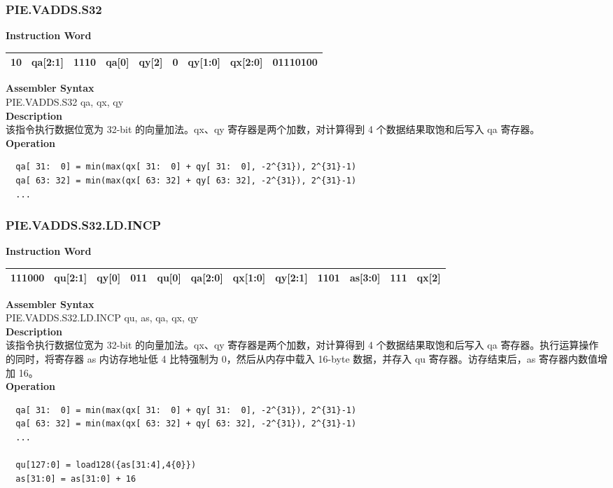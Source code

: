 \newpage
\subsubsection{PIE.VADDS.S32}\label{instruction:PIEVADDSS32}
\setlength\tabcolsep{6pt}
\textbf{Instruction Word} \\
\begin{tabular}{|c|c|c|c|c|c|c|c|c|}
	\hline
	10 & qa[2:1] & 1110 & qa[0] & qy[2] & 0 & qy[1:0] & qx[2:0] & 01110100 \\
	\hline
\end{tabular}

\textbf{Assembler Syntax} \\
PIE.VADDS.S32 qa, qx, qy \\
\textbf{Description} \\
该指令执行数据位宽为 32-bit 的向量加法。qx、qy 寄存器是两个加数，对计算得到 4 个数据结果取饱和后写入 qa 寄存器。\\
\textbf{Operation}
\begin{lstlisting}
  qa[ 31:  0] = min(max(qx[ 31:  0] + qy[ 31:  0], -2^{31}), 2^{31}-1)
  qa[ 63: 32] = min(max(qx[ 63: 32] + qy[ 63: 32], -2^{31}), 2^{31}-1)
  ...
\end{lstlisting}

\newpage
\subsubsection{PIE.VADDS.S32.LD.INCP}\label{instruction:PIEVADDSS32LDINCP}
\setlength\tabcolsep{6pt}
\textbf{Instruction Word} \\
\begin{tabular}{|c|c|c|c|c|c|c|c|c|c|c|c|}
	\hline
	111000 & qu[2:1] & qy[0] & 011 & qu[0] & qa[2:0] & qx[1:0] & qy[2:1] & 1101 & as[3:0] & 111 & qx[2] \\
	\hline
\end{tabular}

\textbf{Assembler Syntax} \\
PIE.VADDS.S32.LD.INCP qu, as, qa, qx, qy \\
\textbf{Description} \\
该指令执行数据位宽为 32-bit 的向量加法。qx、qy 寄存器是两个加数，对计算得到 4 个数据结果取饱和后写入 qa 寄存器。执行运算操作的同时，将寄存器 as 内访存地址低 4 比特强制为 0，然后从内存中载入 16-byte 数据，并存入 qu 寄存器。访存结束后，as 寄存器内数值增加 16。\\
\textbf{Operation}
\begin{lstlisting}
  qa[ 31:  0] = min(max(qx[ 31:  0] + qy[ 31:  0], -2^{31}), 2^{31}-1)
  qa[ 63: 32] = min(max(qx[ 63: 32] + qy[ 63: 32], -2^{31}), 2^{31}-1)
  ...

  qu[127:0] = load128({as[31:4],4{0}})
  as[31:0] = as[31:0] + 16
\end{lstlisting}


